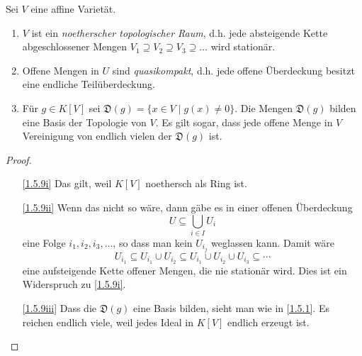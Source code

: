 \documentclass[a4paper,12pt,index=toc]{scrbook}
\theoremstyle{keinenummern} %
\newcommand{\D}{\mathfrak{D}}
\renewcommand{\dotsc}{\ensuremath{\!...}}
\begin{document}
\begin{bem}\label{1.5.9}
  Sei $V$ eine affine Varietät.
  \begin{enumerate}
  \item{} $V$ ist ein \emph{noetherscher topologischer Raum}, d.h. jede absteigende Kette abgeschlossener Mengen
    $V_1\supseteq V_2\supseteq V_3\supseteq\dotso$ wird stationär.
  \item{} Offene Mengen in $U$ sind \emph{quasikompakt}, d.h. jede offene Überdeckung besitzt eine endliche
    Teilüberdeckung.
  \item{} Für $g\in K[V]$ sei $\D(g)=\{x\in V\mid g(x)\neq0\}$. Die Mengen $\D(g)$ bilden eine Basis der Topologie
    von $V$. Es gilt sogar, dass jede offene Menge in $V$ Vereinigung von endlich vielen der $\D(g)$ ist.
  \end{enumerate}
\end{bem}
\begin{proof}
  \begin{enumerate}
  \item[\ref{1.5.9i}] Das gilt, weil $K[V]$ noethersch als Ring ist.
  \item[\ref{1.5.9ii}] Wenn das nicht so wäre, dann gäbe es in einer offenen Überdeckung \[U\subseteq\bigcup_{i\in I}U_i\] eine
    Folge $i_1,i_2,i_3,\dotsc$, so dass man kein $U_{i_j}$ weglassen kann. Damit wäre \[U_{i_1}\subseteq U_{i_1}\cup U_{i_2}
    \subseteq U_{i_1}\cup U_{i_2}\cup U_{i_3}\subseteq \dotsm\] eine aufsteigende Kette offener Mengen, die nie stationär
    wird. Dies ist ein Widerspruch zu \ref{1.5.9i}.
  \item[\ref{1.5.9iii}] Dass die $\D(g)$ eine Basis bilden, sieht man wie in \cref{1.5.1}. Es reichen endlich viele, weil
    jedes Ideal in $K[V]$ endlich erzeugt ist.
  \end{enumerate}
\end{proof}

\end{document}
